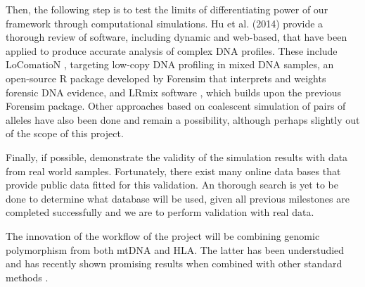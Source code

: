 \documentclass[10pt]{article}
\begin{document}
Then, the following step is to test the limits of differentiating power of our framework through computational simulations. Hu et al. (2014) \cite{Hu2014} provide a thorough review of software, including dynamic and web-based, that have been applied to produce accurate analysis of complex DNA profiles. These include LoComatioN \cite{Gill2007}, targeting low-copy DNA profiling in mixed DNA samples, an open-source R package developed by Forensim \cite{Haned2011forensim} that interprets and weights forensic DNA evidence, and LRmix software \cite{Haned2011analysis}, which builds upon the previous Forensim package. Other approaches based on coalescent simulation of pairs of alleles have also been done and remain a possibility, although perhaps slightly out of the scope of this project.

Finally, if possible, demonstrate the validity of the simulation results with data from real world samples. Fortunately, there exist many online data bases that provide public data fitted for this validation. An thorough search is yet to be done to determine what database will be used, given all previous milestones are completed successfully and we are to perform validation with real data.

The innovation of the workflow of the project will be combining genomic polymorphism from both mtDNA and HLA. The latter has been understudied and has recently shown promising results when combined with other standard methods \cite{Kuffel2019}. 








\printbibliography
\end{document}
